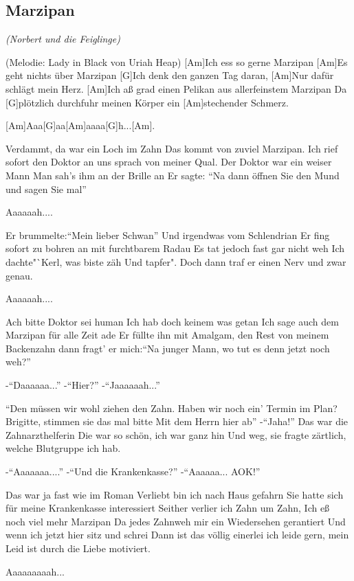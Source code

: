 \documentclass[a5paper,pagesize,twoside,10pt,headings=small]{scrreprt}
\newcommand\songheader[3][]{%
  \clearpage%
    \subsection*{\centering #2}\vspace{0.5\baselineskip}%
    \addcontentsline{toc}{subsection}{#2}
    \centering \textit{#3}\\%
    \vspace{\baselineskip}\par%
}
\begin{document}
\songheader{Marzipan}{(Norbert und die Feiglinge)}
\begin{guitar}
{\tiny(Melodie: Lady in Black von Uriah Heap)}
[Am]Ich ess so gerne Marzipan
[Am]Es geht nichts über Marzipan
[G]Ich denk den ganzen Tag daran,
[Am]Nur dafür schlägt mein Herz.
[Am]Ich aß grad einen Pelikan aus allerfeinstem Marzipan
Da [G]plötzlich durchfuhr meinen Körper ein [Am]stechender Schmerz.

[Am]Aaa[G]aa[Am]aaaa[G]h...[Am].

Verdammt, da war ein Loch im Zahn
Das kommt von zuviel Marzipan.
Ich rief sofort den Doktor an uns sprach von meiner Qual.
Der Doktor war ein weiser Mann
Man sah's ihm an der Brille an
Er sagte: "`Na dann öffnen Sie den Mund und sagen Sie mal"'

Aaaaaah....

Er brummelte:"`Mein lieber Schwan"'
Und irgendwas vom Schlendrian
Er fing sofort zu bohren an mit furchtbarem Radau
Es tat jedoch fast gar nicht weh
Ich dachte"`Kerl, was biste zäh
Und tapfer". Doch dann traf er einen Nerv und zwar genau.

Aaaaaah....

Ach bitte Doktor sei human
Ich hab doch keinem was getan
Ich sage auch dem Marzipan für alle Zeit ade
Er füllte ihn mit Amalgam, den Rest von meinem Backenzahn
dann fragt' er mich:"`Na junger Mann, wo tut es denn jetzt noch weh?"'

-"`Daaaaaa..."'
-"`Hier?"'
-"`Jaaaaaah..."'

"`Den müssen wir wohl ziehen den Zahn.
Haben wir noch ein' Termin im Plan?
Brigitte, stimmen sie das mal bitte
Mit dem Herrn hier ab"' -"`Jaha!"'
Das war die Zahnarzthelferin
Die war so schön, ich war ganz hin
Und weg, sie fragte zärtlich, welche Blutgruppe ich hab.

-"`Aaaaaaa...."'
-"`Und die Krankenkasse?"'
-"`Aaaaaa... AOK!"'

Das war ja fast wie im Roman
Verliebt bin ich nach Haus gefahrn
Sie hatte sich für meine Krankenkasse interessiert
Seither verlier ich Zahn um Zahn,
Ich eß noch viel mehr Marzipan
Da jedes Zahnweh mir ein Wiedersehen gerantiert
Und wenn ich jetzt hier sitz und schrei
Dann ist das völlig einerlei
ich leide gern, mein Leid ist durch die Liebe motiviert.

Aaaaaaaaah...
\end{guitar}
\end{document}
